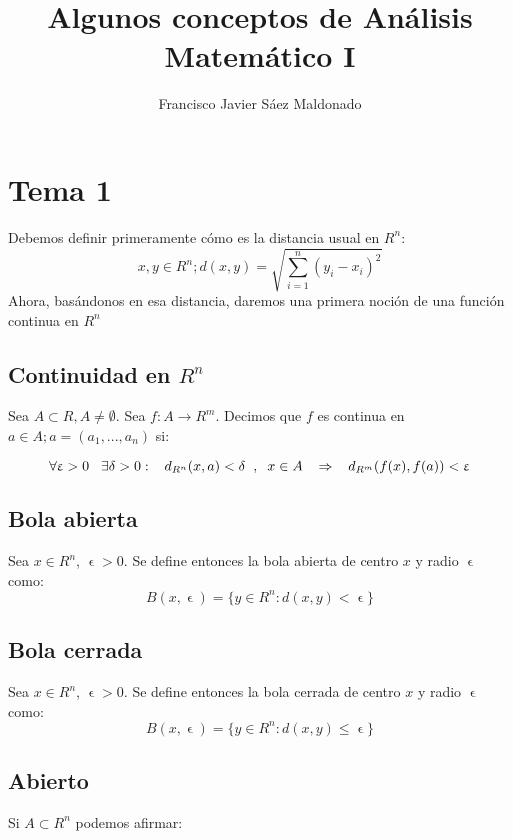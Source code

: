 \documentclass[11pt]{article}
\title{\textbf{Algunos conceptos de Análisis Matemático I}}
\author{Francisco Javier Sáez Maldonado}
\date{}
\begin{document}
\maketitle



\section*{Tema 1}

Debemos definir primeramente cómo es la distancia usual en $R^n$:
\[
x,y \in R^n ; d(x,y) = \sqrt{\sum_{i=1}^n (y_i - x_i)^2}
\]
Ahora, basándonos en esa distancia, daremos una primera noción de una función continua en $R^n$


\subsection*{Continuidad en $R^n$}
Sea $A \subset R, A \neq \emptyset$. Sea $f: A \to R^m$. Decimos que $f$ es continua en $a \in A; a = (a_1,...,a_n)$ si:

\[
\forall \upvarepsilon > 0  \hspace{0.3cm}\exists \delta > 0 :\hspace{0.3cm} d_{R^n}(x,a)< \delta \hspace{0.2cm} ,\hspace{0.2cm} x \in A\hspace{0.3cm} \Rightarrow \hspace{0.3cm} d_{R^m}(f(x),f(a))< \upvarepsilon
\]


\subsection*{Bola abierta}

Sea $x\in R^n$, $\upvarepsilon > 0$. Se define entonces la bola abierta de centro $x$ y radio $\upvarepsilon$ como:
\[
B(x,\upvarepsilon) = \{ y \in R^n : d(x,y) < \upvarepsilon\}
\]



\subsection*{Bola cerrada}

Sea $x\in R^n$, $\upvarepsilon > 0$. Se define entonces la bola cerrada de centro $x$ y radio $\upvarepsilon$ como:
\[
B(x,\upvarepsilon) = \{ y \in R^n : d(x,y) \leq \upvarepsilon\}
\]



\subsection*{Abierto}
Si $A\subset R^n$ podemos afirmar:
\end{document}
